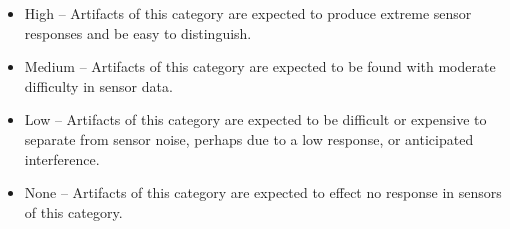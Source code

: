 \begin{itemize}
	\item High -- Artifacts of this category are expected to produce extreme sensor responses and be easy to distinguish.
	\item Medium -- Artifacts of this category are expected to be found with moderate difficulty in sensor data.
	\item Low -- Artifacts of this category are expected to be difficult or expensive to separate from sensor noise, perhaps due to a low response, or anticipated interference.
	\item None -- Artifacts of this category are expected to effect no response in sensors of this category.
\end{itemize}



